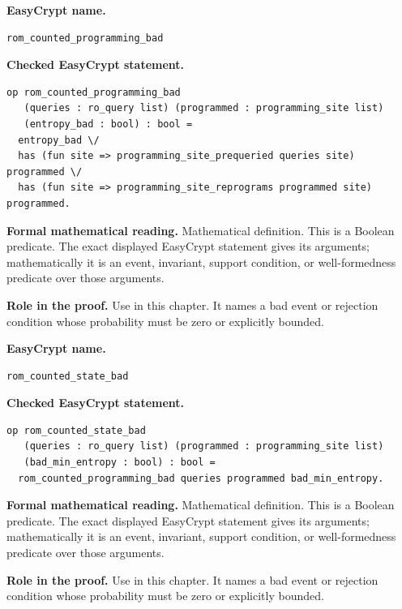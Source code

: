 \begin{formaldefinition}
\noindent\textbf{EasyCrypt name.}
\begin{lstlisting}[language=EasyCrypt,basicstyle=\ttfamily\scriptsize]
rom_counted_programming_bad
\end{lstlisting}
\noindent\textbf{Checked EasyCrypt statement.}
\begin{lstlisting}[language=EasyCrypt,basicstyle=\ttfamily\scriptsize]
op rom_counted_programming_bad
   (queries : ro_query list) (programmed : programming_site list)
   (entropy_bad : bool) : bool =
  entropy_bad \/
  has (fun site => programming_site_prequeried queries site) programmed \/
  has (fun site => programming_site_reprograms programmed site) programmed.
\end{lstlisting}
\noindent\textbf{Formal mathematical reading.}
Mathematical definition. This is a Boolean predicate.  The exact displayed EasyCrypt statement gives its arguments; mathematically it is an event, invariant, support condition, or well-formedness predicate over those arguments.

\noindent\textbf{Role in the proof.}
Use in this chapter. It names a bad event or rejection condition whose probability must be zero or explicitly bounded.

\end{formaldefinition}

\begin{formaldefinition}
\noindent\textbf{EasyCrypt name.}
\begin{lstlisting}[language=EasyCrypt,basicstyle=\ttfamily\scriptsize]
rom_counted_state_bad
\end{lstlisting}
\noindent\textbf{Checked EasyCrypt statement.}
\begin{lstlisting}[language=EasyCrypt,basicstyle=\ttfamily\scriptsize]
op rom_counted_state_bad
   (queries : ro_query list) (programmed : programming_site list)
   (bad_min_entropy : bool) : bool =
  rom_counted_programming_bad queries programmed bad_min_entropy.
\end{lstlisting}
\noindent\textbf{Formal mathematical reading.}
Mathematical definition. This is a Boolean predicate.  The exact displayed EasyCrypt statement gives its arguments; mathematically it is an event, invariant, support condition, or well-formedness predicate over those arguments.

\noindent\textbf{Role in the proof.}
Use in this chapter. It names a bad event or rejection condition whose probability must be zero or explicitly bounded.

\end{formaldefinition}

